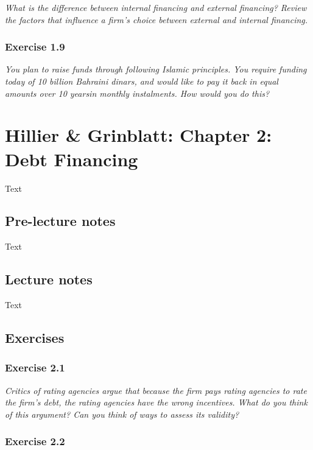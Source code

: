 \documentclass[]{book}
\theoremstyle{definition}
\theoremstyle{definition}
\theoremstyle{remark}
\begin{document}
\emph{What is the difference between internal financing and external
financing? Review the factors that influence a firm's choice between
external and internal financing.} \citep[p.26]{book}

\subsection{Exercise 1.9}\label{exercise-1.9}

\emph{You plan to raise funds through following Islamic principles. You
require funding today of 10 billion Bahraini dinars, and would like to
pay it back in equal amounts over 10 yearsin monthly instalments. How
would you do this?} \citep[p.26]{book}

\chapter{Hillier \& Grinblatt: Chapter 2: Debt
Financing}\label{hillier-grinblatt-chapter-2-debt-financing}

Text

\section{Pre-lecture notes}\label{pre-lecture-notes-1}

Text

\section{Lecture notes}\label{lecture-notes-1}

Text

\section{Exercises}\label{exercises-1}

\subsection{Exercise 2.1}\label{exercise-2.1}

\emph{Critics of rating agencies argue that because the firm pays rating
agencies to rate the firm's debt, the rating agencies have the wrong
incentives. What do you think of this argument? Can you think of ways to
assess its validity?} \citep[p.55]{book}

\subsection{Exercise 2.2}\label{exercise-2.2}
\end{document}

